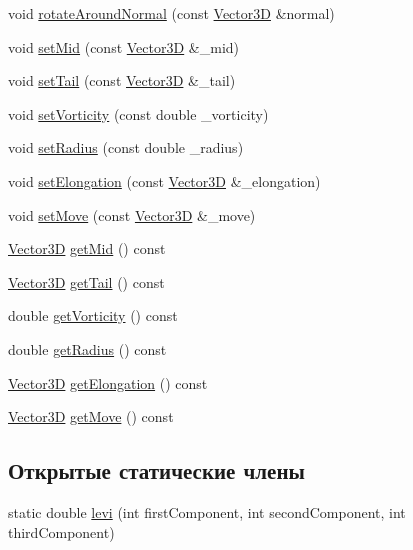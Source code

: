 \begin{DoxyCompactItemize}
\item 
void \mbox{\hyperlink{class_vorton_ac6f98f9a9c59603874e21ca04c3fb2ff}{rotate\+Around\+Normal}} (const \mbox{\hyperlink{class_vector3_d}{Vector3D}} \&normal)
\item 
void \mbox{\hyperlink{class_vorton_a116136f55d5f22738a734a109b7bb80b}{set\+Mid}} (const \mbox{\hyperlink{class_vector3_d}{Vector3D}} \&\+\_\+mid)
\item 
void \mbox{\hyperlink{class_vorton_a3f2b658270131805f1bf8c74ab4947ab}{set\+Tail}} (const \mbox{\hyperlink{class_vector3_d}{Vector3D}} \&\+\_\+tail)
\item 
void \mbox{\hyperlink{class_vorton_a2684a3a144977b936e7a046bbee1bf78}{set\+Vorticity}} (const double \+\_\+vorticity)
\item 
void \mbox{\hyperlink{class_vorton_a964e73e592fc49e1a410f9f825cddfdf}{set\+Radius}} (const double \+\_\+radius)
\item 
void \mbox{\hyperlink{class_vorton_a70d51b5d11a7029583e480bfb45748af}{set\+Elongation}} (const \mbox{\hyperlink{class_vector3_d}{Vector3D}} \&\+\_\+elongation)
\item 
void \mbox{\hyperlink{class_vorton_ad02474d8833546ada1b6e7b0faaab95c}{set\+Move}} (const \mbox{\hyperlink{class_vector3_d}{Vector3D}} \&\+\_\+move)
\item 
\mbox{\hyperlink{class_vector3_d}{Vector3D}} \mbox{\hyperlink{class_vorton_a3dfd18d1d932adfb498c10b1ce9c669c}{get\+Mid}} () const
\item 
\mbox{\hyperlink{class_vector3_d}{Vector3D}} \mbox{\hyperlink{class_vorton_a3f0a542df7fcc9436e62b0062a70df10}{get\+Tail}} () const
\item 
double \mbox{\hyperlink{class_vorton_a2e71d444521b5d0639d145a497ce52a2}{get\+Vorticity}} () const
\item 
double \mbox{\hyperlink{class_vorton_a623eaa7a5716b9499f0872960fdb0052}{get\+Radius}} () const
\item 
\mbox{\hyperlink{class_vector3_d}{Vector3D}} \mbox{\hyperlink{class_vorton_a4bb2c538b74dd47deb784e3ef3f86eed}{get\+Elongation}} () const
\item 
\mbox{\hyperlink{class_vector3_d}{Vector3D}} \mbox{\hyperlink{class_vorton_a607fd1efecaf9c2f1623f8b2b93eebce}{get\+Move}} () const
\end{DoxyCompactItemize}
\subsection*{Открытые статические члены}
\begin{DoxyCompactItemize}
\item 
static double \mbox{\hyperlink{class_vorton_a72ddb05ff2a5004dae0aaa707e685da7}{levi}} (int first\+Component, int second\+Component, int third\+Component)
\end{DoxyCompactItemize}
